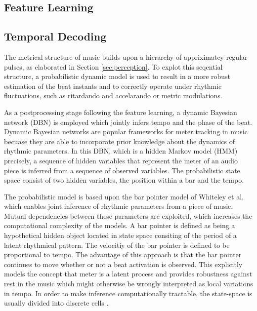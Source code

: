 \documentclass{scrartcl}
\begin{document}
\subsection{Feature Learning}



\subsection{Temporal Decoding}
\label{sec:temporal_decoding}

The metrical structure of music builds upon a hierarchy of appriximatey regular pulses, as elaborated in Section \ref{sec:perception}. To explot this seqential structure, a probabilistic dynamic model is used to result in a more robust estimation of the beat instants and to correctly operate under rhythmic fluctuations, such as ritardando and accelarando or metric modulations.

As a postprocessing stage following the feature learning, a dynamic Bayesian network (DBN) is employed which jointly infers tempo and the phase of the beat. Dynamic Bayesian networks are popular frameworks for meter tracking in music becuase they are able to incorporate prior knowledge about the dynamics of rhythmic parameters. 
In this DBN, which is a hidden Markov model (HMM) precisely, a sequence of hidden variables that represent the meter of an audio piece is inferred from a sequence of observed variables. The probabilistic state space consist of two hidden variables, the position within a bar and the tempo. 

The probabilistic model is based upon the bar pointer model of Whiteley et al. \cite{Whiteley2006} which enables joint inference of rhythmic parameters from a piece of music. Mutual dependencies between these parameters are exploited, which increases the computational complexity of the models. A bar pointer is defined as being a hypothetical hidden object located in state space consiting of the period of a latent rhythmical pattern. The velocitiy of the bar pointer is defined to be proportional to tempo. The advantage of this approach is that the bar pointer continues to move whether or not a beat activation is observed. This explicitly models the concept that meter is a latent process and provides robustness against rest in the music which might otherwise be wrongly interpreted as local variations in tempo. In order to make inference computationally tractable, the state-space is usually divided into discrete cells \cite{Krebs2015}. 
\end{document}
